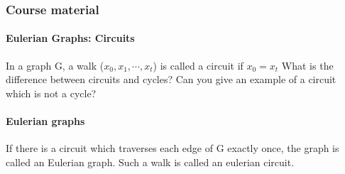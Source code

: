 \documentclass{article}
\begin{document}
\subsubsection{Course material}
\paragraph{Eulerian Graphs: Circuits}
In a graph G, a walk ($x_0,x_1,\cdots ,x_t$) is called a circuit if $x_0=x_t$\newline
What is the difference between circuits and cycles?\newline
Can you give an example of a circuit which is not a cycle?\newline
\paragraph{Eulerian graphs}If there is a circuit which traverses each edge of G exactly once, the graph is called an Eulerian graph.\newline
Such a walk is called an eulerian circuit.\newline
\end{document}
